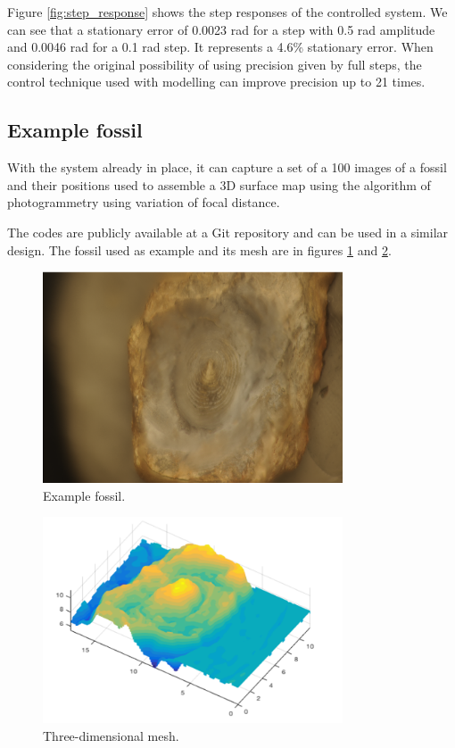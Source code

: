\documentclass[journal]{IEEEtran}
\begin{document}
Figure \ref{fig:step_response} shows the step responses of the controlled system. We can see that a stationary error of 0.0023 rad for a step with 0.5 rad amplitude and 0.0046 rad for a 0.1 rad step. It represents a 4.6\% stationary error. When considering the original possibility of using precision given by full steps, the control technique used with modelling can improve precision up to 21 times.

\subsection{Example fossil}

With the system already in place, it can capture a set of a 100 images of a fossil and their positions used to assemble a 3D surface map using the algorithm of photogrammetry using variation of focal distance.

The codes are publicly available at a Git repository and can be used in a similar design. The fossil used as example and its mesh are in figures \ref{fig:fossil} and \ref{fig:fossil_3d}.    

\begin{figure}[!t]
\centering
\includegraphics[width=3.5in]{fossil.png}
\caption{Example fossil.}
\label{fig:fossil}
\end{figure}

\begin{figure}[!t]
\centering
\includegraphics[width=3.5in]{fossil_3d.png}
\caption{Three-dimensional mesh.}
\label{fig:fossil_3d}
\end{figure}
\end{document}
